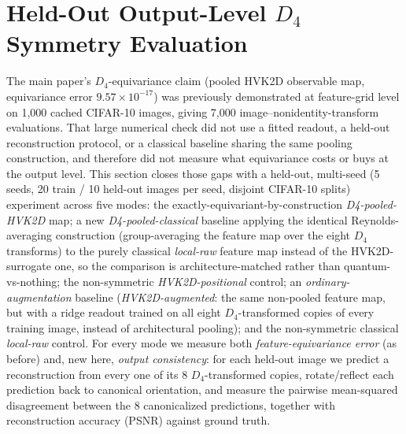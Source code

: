 \documentclass[11pt]{article}
\begin{document}
\section{Held-Out Output-Level \texorpdfstring{$D_4$}{D4} Symmetry Evaluation}
\label{sec:d4_symmetry_experiment}
The main paper's $D_4$-equivariance claim (pooled HVK2D observable map, equivariance error $9.57\times10^{-17}$) was previously demonstrated at feature-grid level on 1,000 cached CIFAR-10 images, giving 7,000 image--nonidentity-transform evaluations. That large numerical check did not use a fitted readout, a held-out reconstruction protocol, or a classical baseline sharing the same pooling construction, and therefore did not measure what equivariance costs or buys at the output level. This section closes those gaps with a held-out, multi-seed (5 seeds, 20 train / 10 held-out images per seed, disjoint CIFAR-10 splits) experiment across five modes: the exactly-equivariant-by-construction \emph{D4-pooled-HVK2D} map; a new \emph{D4-pooled-classical} baseline applying the identical Reynolds-averaging construction (group-averaging the feature map over the eight $D_4$ transforms) to the purely classical \emph{local-raw} feature map instead of the HVK2D-surrogate one, so the comparison is architecture-matched rather than quantum-vs-nothing; the non-symmetric \emph{HVK2D-positional} control; an \emph{ordinary-augmentation} baseline (\emph{HVK2D-augmented}: the same non-pooled feature map, but with a ridge readout trained on all eight $D_4$-transformed copies of every training image, instead of architectural pooling); and the non-symmetric classical \emph{local-raw} control. For every mode we measure both \emph{feature-equivariance error} (as before) and, new here, \emph{output consistency}: for each held-out image we predict a reconstruction from every one of its 8 $D_4$-transformed copies, rotate/reflect each prediction back to canonical orientation, and measure the pairwise mean-squared disagreement between the 8 canonicalized predictions, together with reconstruction accuracy (PSNR) against ground truth.
\end{document}
